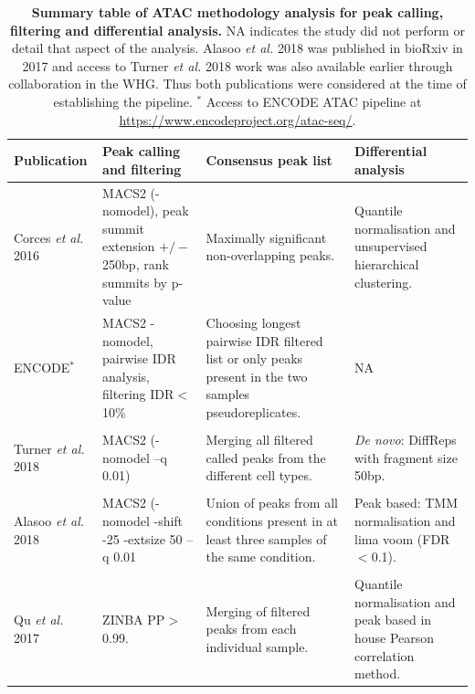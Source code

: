 \begin{landscape}
\begin{center}
\renewcommand{\arraystretch}{0.7}	
\begin{longtable}[ht]{p{.20\textheight} p{.40\textheight} p{.40\textheight} p{.40\textheight}}
\caption[Summary table of ATAC analysis methodology for peak calling, filtering and differential analysis.]{\textbf{Summary table of ATAC methodology analysis for peak calling, filtering and differential analysis.} NA indicates the study did not perform or detail that aspect of the analysis. Alasoo \textit{et al.} 2018 was published in bioRxiv in 2017 and access to Turner \textit{et al.} 2018 work was also available earlier through collaboration in the WHG. Thus both publications were considered at the time of establishing the pipeline. $^{\ast}$ Access to ENCODE ATAC pipeline at \url{https://www.encodeproject.org/atac-seq/}.}
\label{tab:ATAC_comparative_methods} \\
\toprule
\textbf{Publication} & \textbf{Peak calling and filtering} & \textbf{Consensus peak list} & \textbf{Differential analysis} \\
\midrule
\midrule
Corces \textit{et al.} 2016 & MACS2 (-nomodel), peak summit extension $+/-$250bp, rank summits by p-value & Maximally significant non-overlapping peaks. & Quantile normalisation and unsupervised hierarchical clustering. \\
ENCODE$^{\ast}$  & MACS2 -nomodel, pairwise IDR analysis, filtering IDR$<$10\% & Choosing longest pairwise IDR filtered list or only peaks present in the two samples pseudoreplicates. & NA \\   
 &&&\\        
Turner \textit{et al.} 2018 	& MACS2 (-nomodel --q 0.01) & Merging all filtered called peaks from the different cell types. & \textit{De novo}: DiffReps with fragment size 50bp. \\             																																						
 &&&\\  
Alasoo \textit{et al.} 2018 & MACS2 (-nomodel -shift -25 -extsize 50 --q 0.01 &	Union of peaks from all conditions present in at least three samples of the same condition. & Peak based: TMM normalisation and lima voom (FDR$<$0.1).\\ 
 &&&\\  
Qu \textit{et al.} 2017 & ZINBA PP$>$0.99. & Merging of filtered peaks from each individual sample. & Quantile normalisation and peak based in house Pearson correlation method. \\	

\end{longtable}
\end{center}
\end{landscape}
